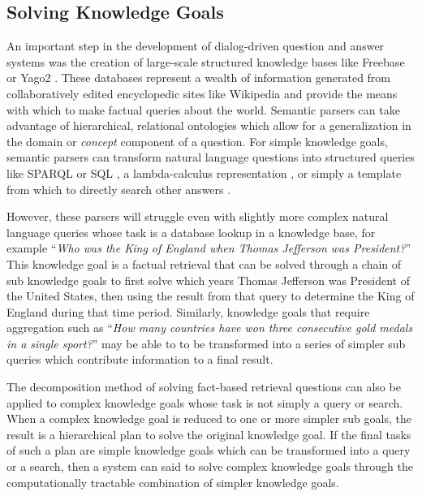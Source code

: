 \documentclass{llncs}
\begin{document}
\subsection{Solving Knowledge Goals}


An important step in the development of dialog-driven question and answer systems was the creation of large-scale structured knowledge bases like Freebase \cite{bollacker_freebase:_2008} or Yago2 \cite{suchanek_yago:_2007}. These databases represent a wealth of information generated from collaboratively edited encyclopedic sites like Wikipedia and provide the means with which to make factual queries about the world. Semantic parsers can take advantage of hierarchical, relational ontologies which allow for a generalization in the domain or \textit{concept} component of a question. For simple knowledge goals, semantic parsers can transform natural language questions into structured queries like SPARQL or SQL \cite{yahya_natural_2012}, a lambda-calculus representation \cite{berant_semantic_2013}, or simply a template from which to directly search other answers \cite{unger_template-based_2012}.

However, these parsers will struggle even with slightly more complex natural language queries whose task is a database lookup in a knowledge base, for example ``\textit{Who was the King of England when Thomas Jefferson was President?}'' This knowledge goal is a factual retrieval that can be solved through a chain of sub knowledge goals to first solve which years Thomas Jefferson was President of the United States, then using the result from that query to determine the King of England during that time period. Similarly, knowledge goals that require aggregation such as ``\textit{How many countries have won three consecutive gold medals in a single sport?}'' may be able to to be transformed into a series of simpler sub queries which contribute information to a final result.

The decomposition method of solving fact-based retrieval questions can also be applied to complex knowledge goals whose task is not simply a query or search. When a complex knowledge goal is reduced to one or more simpler sub goals, the result is a hierarchical plan to solve the original knowledge goal. If the final tasks of such a plan are simple knowledge goals which can be transformed into a query or a search, then a system can said to solve complex knowledge goals through the computationally tractable combination of simpler knowledge goals.
\end{document}
